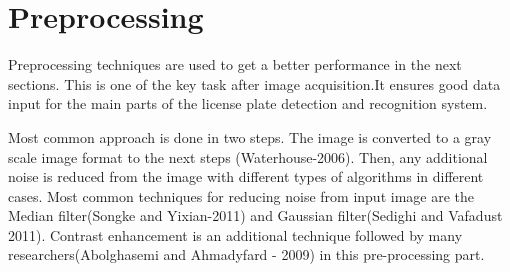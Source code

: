 \documentclass{standalone}
\begin{document}
\section{Preprocessing}
Preprocessing techniques are used to get a better performance in the next sections. This is one of the key task after image acquisition.It ensures good data input for the main parts of the license plate detection and recognition system.

Most common approach is done in two steps. The image is converted to a gray scale image format to the next steps (Waterhouse-2006). Then, any additional noise is reduced from the image with different types of algorithms in different cases. Most common techniques for reducing noise from input image are the Median filter(Songke and Yixian-2011)
and Gaussian filter(Sedighi and Vafadust 2011). Contrast enhancement is an additional technique followed by many researchers(Abolghasemi and Ahmadyfard - 2009) in this pre-processing part.
\end{document}
